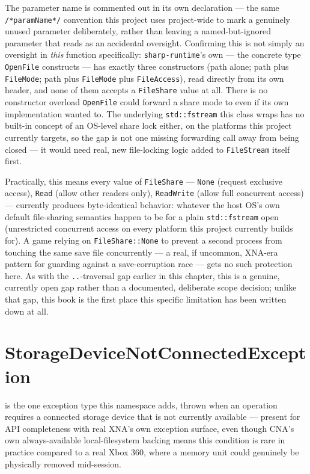 The parameter name is commented out in its own declaration --- the same
\texttt{/*paramName*/} convention this project uses project-wide to mark a genuinely unused
parameter deliberately, rather than leaving a named-but-ignored parameter that reads as an
accidental oversight. Confirming this is not simply an oversight in \emph{this} function
specifically: \texttt{sharp-runtime}'s own  --- the concrete
type \texttt{OpenFile} constructs --- has exactly three constructors (path alone; path plus
\texttt{FileMode}; path plus \texttt{FileMode} plus \texttt{FileAccess}), read directly from
its own header, and none of them accepts a \texttt{FileShare} value at all. There is no
constructor overload \texttt{OpenFile} could forward a share mode to even if its own
implementation wanted to. The underlying \texttt{std::fstream} this class wraps has no built-in
concept of an OS-level share lock either, on the platforms this project currently targets, so
the gap is not one missing forwarding call away from being closed --- it would need real,
new file-locking logic added to \texttt{FileStream} itself first.

Practically, this means every value of \texttt{FileShare} --- \texttt{None} (request exclusive
access), \texttt{Read} (allow other readers only), \texttt{ReadWrite} (allow full concurrent
access) --- currently produces byte-identical behavior: whatever the host OS's own default
file-sharing semantics happen to be for a plain \texttt{std::fstream} open (unrestricted
concurrent access on every platform this project currently builds for). A game relying on
\texttt{FileShare::None} to prevent a second process from touching the same save file
concurrently --- a real, if uncommon, XNA-era pattern for guarding against a save-corruption
race --- gets no such protection here. As with the \texttt{..}-traversal gap earlier in this
chapter, this is a genuine, currently open gap rather than a documented, deliberate scope
decision; unlike that gap, this book is the first place this specific limitation has been
written down at all.

\section{StorageDeviceNotConnectedException}

 is the one exception type this namespace adds,
thrown when an operation requires a connected storage device that is not currently available
--- present for API completeness with real XNA's own exception surface, even though CNA's own
always-available local-filesystem backing means this condition is rare in practice compared
to a real Xbox 360, where a memory unit could genuinely be physically removed mid-session.

